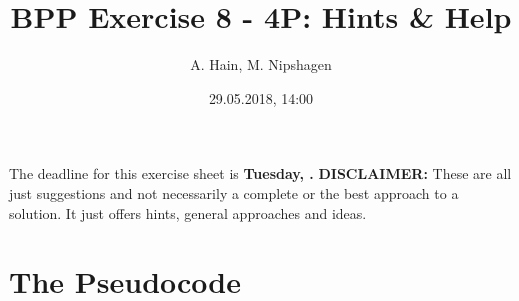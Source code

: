 

\title{BPP Exercise 8 - 4P: Hints \& Help}
\author{A. Hain, M. Nipshagen}
\date{29.05.2018, 14:00}

\makeatletter
\let\thetitle\@title
\let\theauthor\@author
\let\thedate\@date
\makeatother

\newcommand\itemsub[1]{
	\begin{itemize}
		\item #1
	\end{itemize}
}

\setcounter{secnumdepth}{0}


The deadline for this exercise sheet is \textbf{Tuesday, \thedate.}
\tableofcontents
\vspace{12pt}\noindent
\textbf{DISCLAIMER:} These are all just suggestions and not necessarily a complete
or the best approach to a solution. It just offers hints, general approaches
and ideas.
\pagebreak

\section{The Pseudocode}


